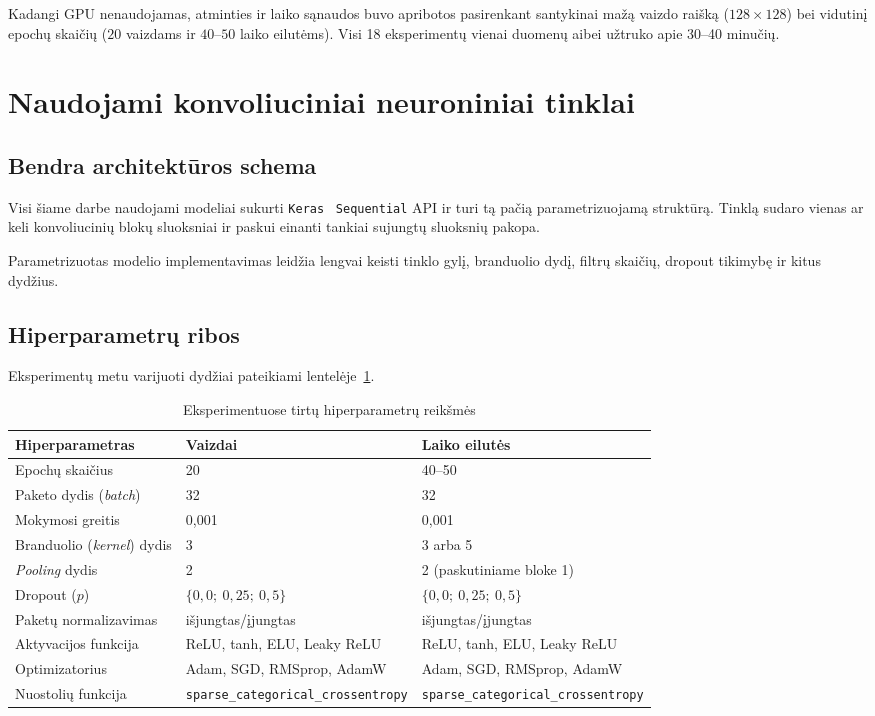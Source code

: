 \documentclass[]{VUMIFTemplateClass}
\begin{document}
Kadangi GPU nenaudojamas, atminties ir laiko sąnaudos buvo apribotos pasirenkant santykinai mažą vaizdo raišką (\(128 \times 128\)) bei vidutinį epochų skaičių (\(20\) vaizdams ir \(40\)--\(50\) laiko eilutėms). Visi 18 eksperimentų vienai duomenų aibei užtruko apie 30--40 minučių.


\section{Naudojami konvoliuciniai neuroniniai tinklai}\label{sec:tinklas}

\subsection{Bendra architektūros schema}

Visi šiame darbe naudojami modeliai sukurti \texttt{Keras}~\cite{keras_docs} \texttt{Sequential} API ir turi tą pačią parametrizuojamą struktūrą. Tinklą sudaro vienas ar keli konvoliucinių blokų sluoksniai ir paskui einanti tankiai sujungtų sluoksnių pakopa.

Parametrizuotas modelio implementavimas leidžia lengvai keisti tinklo gylį, branduolio dydį, filtrų skaičių, dropout tikimybę ir kitus dydžius.

\subsection{Hiperparametrų ribos}

Eksperimentų metu varijuoti dydžiai pateikiami lentelėje~\ref{tab:hp}.

\begin{table}[H]
    \centering
    \caption{Eksperimentuose tirtų hiperparametrų reikšmės}
    \label{tab:hp}
    \begin{tabular}{|l|l|l|}
        \hline
        \textbf{Hiperparametras} & \textbf{Vaizdai} & \textbf{Laiko eilutės}\\
        \hline
        Epochų skaičius & 20 & 40--50 \\ \hline
        Paketo dydis (\textit{batch}) & 32 & 32 \\ \hline
        Mokymosi greitis & 0{,}001 & 0{,}001 \\ \hline
        Branduolio (\textit{kernel}) dydis & 3 & 3 arba 5 \\ \hline
        \textit{Pooling} dydis & 2 & 2 (paskutiniame bloke 1) \\ \hline
        Dropout (\(p\)) & \(\{0{,}0;\ 0{,}25;\ 0{,}5\}\) & \(\{0{,}0;\ 0{,}25;\ 0{,}5\}\) \\ \hline
        Paketų normalizavimas & išjungtas/įjungtas & išjungtas/įjungtas \\ \hline
        Aktyvacijos funkcija & ReLU, tanh, ELU, Leaky ReLU & ReLU, tanh, ELU, Leaky ReLU \\ \hline
        Optimizatorius & Adam, SGD, RMSprop, AdamW & Adam, SGD, RMSprop, AdamW \\ \hline
        Nuostolių funkcija & \texttt{sparse\_categorical\_crossentropy} & \texttt{sparse\_categorical\_crossentropy} \\ \hline
    \end{tabular}
\end{table}
\end{document}
